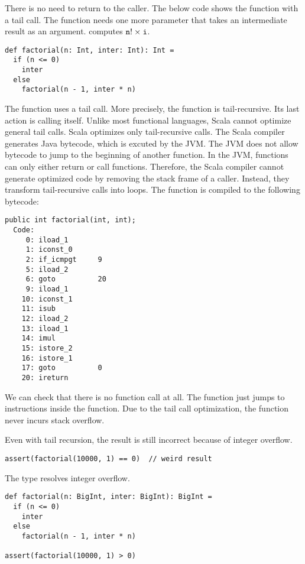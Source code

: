 There is no need to return to the caller. The below code shows the
 function with a tail call. The function needs one more parameter
that takes an intermediate result as an argument.
 computes \(\texttt{n}!\times\texttt{i}\).

\begin{verbatim}
def factorial(n: Int, inter: Int): Int =
  if (n <= 0)
    inter
  else
    factorial(n - 1, inter * n)
\end{verbatim}

The function uses a tail call. More precisely, the function is
tail-recursive. Its last action is calling itself. Unlike most functional
languages, Scala cannot optimize general tail calls. Scala optimizes only
tail-recursive calls.
The Scala compiler generates Java bytecode, which is excuted by the JVM. The JVM does not
allow bytecode to jump to the beginning of another function. In the JVM, functions can
only either return or call functions. Therefore, the Scala compiler cannot generate
optimized code by removing the stack frame of a caller. Instead, they transform
tail-recursive calls into loops.
The  function is compiled to the following bytecode:

\begin{verbatim}
public int factorial(int, int);
  Code:
     0: iload_1
     1: iconst_0
     2: if_icmpgt     9
     5: iload_2
     6: goto          20
     9: iload_1
    10: iconst_1
    11: isub
    12: iload_2
    13: iload_1
    14: imul
    15: istore_2
    16: istore_1
    17: goto          0
    20: ireturn
\end{verbatim}

We can check that there is no function call at
all.
The function just jumps to instructions inside the function.
Due to the tail call optimization, the function never incurs stack overflow.

Even with tail recursion,
the result is still incorrect because of integer overflow.

\begin{verbatim}
assert(factorial(10000, 1) == 0)  // weird result
\end{verbatim}

The  type resolves integer overflow.

\begin{verbatim}
def factorial(n: BigInt, inter: BigInt): BigInt =
  if (n <= 0)
    inter
  else
    factorial(n - 1, inter * n)

assert(factorial(10000, 1) > 0)
\end{verbatim}

